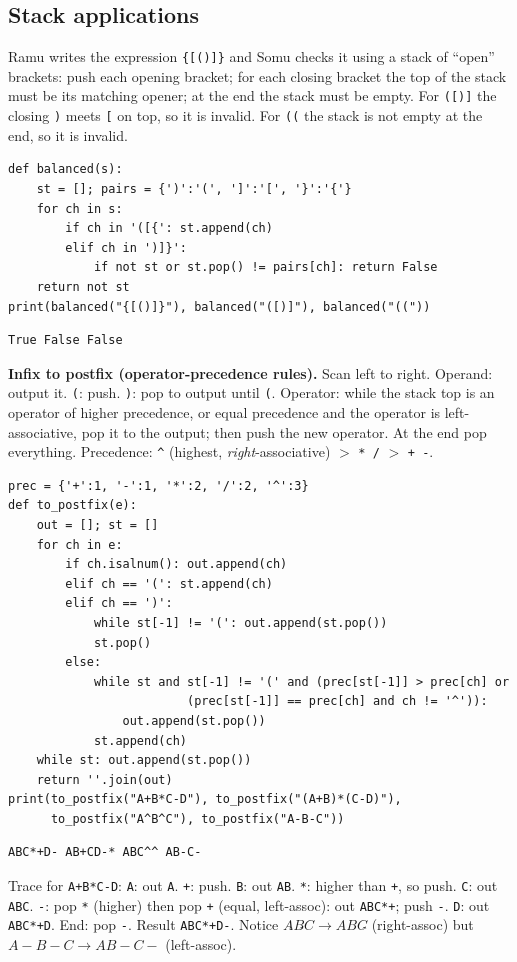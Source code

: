 \documentclass[11pt,a4paper]{article}
\newcommand{\py}[1]{\texttt{#1}}
\begin{document}
\subsection{Stack applications}
\begin{story}
Ramu writes the expression \py{\{[()]\}} and Somu checks it using a stack of ``open'' brackets: push each opening bracket; for each closing bracket the top of the stack must be its matching opener; at the end the stack must be empty. For \py{([)]} the closing \py{)} meets \py{[} on top, so it is invalid. For \py{((} the stack is not empty at the end, so it is invalid.
\end{story}
\begin{lstlisting}
def balanced(s):
    st = []; pairs = {')':'(', ']':'[', '}':'{'}
    for ch in s:
        if ch in '([{': st.append(ch)
        elif ch in ')]}':
            if not st or st.pop() != pairs[ch]: return False
    return not st
print(balanced("{[()]}"), balanced("([)]"), balanced("(("))
\end{lstlisting}
\begin{lstlisting}[style=out]
True False False
\end{lstlisting}
\textbf{Infix to postfix (operator-precedence rules).} Scan left to right. Operand: output it. \py{(}: push. \py{)}: pop to output until \py{(}. Operator: while the stack top is an operator of higher precedence, or equal precedence and the operator is left-associative, pop it to the output; then push the new operator. At the end pop everything. Precedence: \py{\^} (highest, \emph{right}-associative) $>$ \py{* /} $>$ \py{+ -}.
\begin{lstlisting}
prec = {'+':1, '-':1, '*':2, '/':2, '^':3}
def to_postfix(e):
    out = []; st = []
    for ch in e:
        if ch.isalnum(): out.append(ch)
        elif ch == '(': st.append(ch)
        elif ch == ')':
            while st[-1] != '(': out.append(st.pop())
            st.pop()
        else:
            while st and st[-1] != '(' and (prec[st[-1]] > prec[ch] or
                         (prec[st[-1]] == prec[ch] and ch != '^')):
                out.append(st.pop())
            st.append(ch)
    while st: out.append(st.pop())
    return ''.join(out)
print(to_postfix("A+B*C-D"), to_postfix("(A+B)*(C-D)"),
      to_postfix("A^B^C"), to_postfix("A-B-C"))
\end{lstlisting}
\begin{lstlisting}[style=out]
ABC*+D- AB+CD-* ABC^^ AB-C-
\end{lstlisting}
Trace for \py{A+B*C-D}: \py{A}: out \py{A}. \py{+}: push. \py{B}: out \py{AB}. \py{*}: higher than \py{+}, so push. \py{C}: out \py{ABC}. \py{-}: pop \py{*} (higher) then pop \py{+} (equal, left-assoc): out \py{ABC*+}; push \py{-}. \py{D}: out \py{ABC*+D}. End: pop \py{-}. Result \py{ABC*+D-}. Notice $A\hat{}B\hat{}C\to ABC\hat{}\hat{}$ (right-assoc) but $A-B-C\to AB-C-$ (left-assoc).
\end{document}
